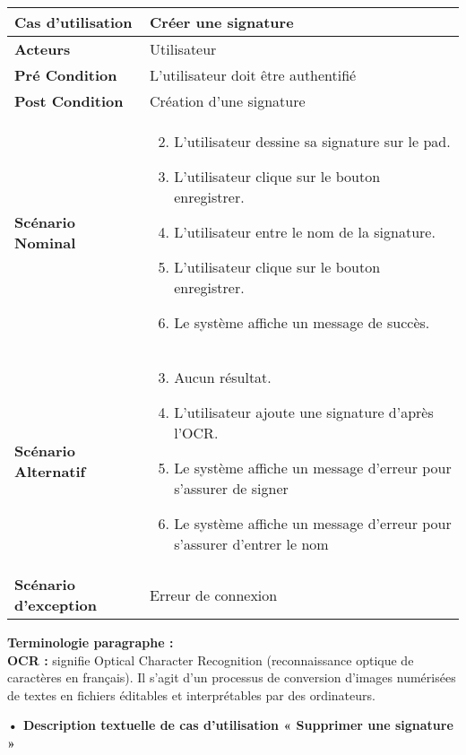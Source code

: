 \begin{longtable}{|p{5cm}|p{10cm}|}
\hline
\textbf{Cas d'utilisation}&Créer une signature\\
\hline
\textbf{Acteurs}&Utilisateur\\
\hline
\textbf{Pré Condition}&L'utilisateur doit être authentifié\\
\hline
\textbf{Post Condition}&Création d'une signature\\
\hline
\textbf{Scénario Nominal}&
\vspace{-\baselineskip}
\begin{enumerate}
    \setcounter{enumi}{1}
  \item L'utilisateur dessine sa signature sur le pad.
  \item L'utilisateur clique sur le bouton enregistrer.
  \item L'utilisateur entre le nom de la signature.
  \item L'utilisateur clique sur le bouton enregistrer.
  \item Le système affiche un message de succès.
\end{enumerate}\\
\hline
\textbf{Scénario Alternatif}&
\vspace{-\baselineskip}
\begin{enumerate}
    \setcounter{enumi}{2}
    \item Aucun résultat.
    \item L'utilisateur ajoute une signature d'après l'OCR.
    \item Le système affiche un message d'erreur pour s'assurer de signer
    \item Le système affiche un message d'erreur pour s'assurer d'entrer le nom
\end{enumerate}\\
\hline
\textbf{Scénario d'exception}&Erreur de connexion\\
\hline
\end{longtable}

\textbf{Terminologie paragraphe :} \\
\textbf{OCR :} signifie Optical Character Recognition (reconnaissance optique de caractères en français). Il s'agit d'un processus de conversion d'images numérisées de textes en fichiers éditables et interprétables par des ordinateurs.
  

\textbf{•	Description textuelle de cas d'utilisation « Supprimer  une signature »}

